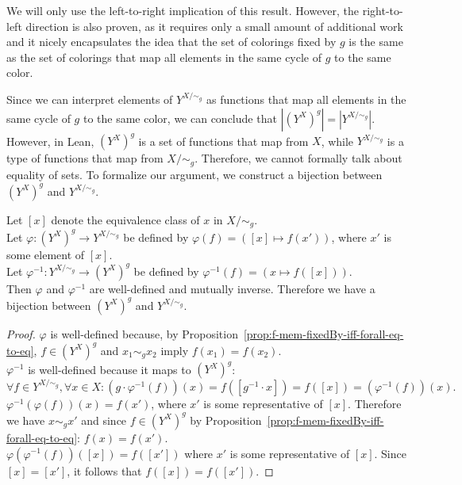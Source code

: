 We will only use the left-to-right implication of this result. However, the right-to-left direction is also proven, as it requires only a small amount of additional work and it nicely encapsulates the idea that the set of colorings fixed by $g$ is the same as the set of colorings that map all elements in the same cycle of $g$ to the same color.

Since we can interpret elements of $Y^{X/\sim_g}$ as functions that map all elements in the same cycle of $g$ to the same color, we can conclude that $|(Y^X)^g| = |Y^{X/\sim_g}|$. However, in Lean, $(Y^X)^g$ is a set of functions that map from $X$, while $Y^{X/\sim_g}$ is a type of functions that map from $X/\sim_g$. Therefore, we cannot formally talk about equality of sets. To formalize our argument, we construct a bijection between $(Y^X)^g$ and $Y^{X/\sim_g}$.

\begin{proposition}
  \label{prop:equiv-of-fixedBy-coloring-of-cycle-coloring}
  \leanok
  Let $[x]$ denote the equivalence class of $x$ in $X/\sim_g$.\\
  Let $\varphi : (Y^X)^g \to Y^{X/\sim_g}$ be defined by $\varphi(f) = ([x] \mapsto f(x'))$, where $x'$ is some element of $[x]$.\\
  Let $\varphi^{-1} : Y^{X/\sim_g} \to (Y^X)^g$ be defined by $\varphi^{-1}(f) = (x \mapsto f([x]))$.\\
  Then $\varphi$ and $\varphi^{-1}$ are well-defined and mutually inverse. Therefore we have a bijection between $(Y^X)^g$ and $Y^{X/\sim_g}$.
\end{proposition}

\begin{proof}
  \leanok
  $\varphi$ is well-defined because, by Proposition~\ref{prop:f-mem-fixedBy-iff-forall-eq-to-eq}, $f \in (Y^X)^g$ and $x_1 \sim_g x_2$ imply $f(x_1) = f(x_2)$.\\
  $\varphi^{-1}$ is well-defined because it maps to $(Y^X)^g$:
  \begin{equation*}
    \forall f \in Y^{X/\sim_g}, \forall x \in X: (g \cdot \varphi^{-1}(f))(x) = f([g^{-1} \cdot x]) = f([x]) = (\varphi^{-1}(f))(x).
  \end{equation*}
  $\varphi^{-1}(\varphi(f))(x) = f(x')$, where $x'$ is some representative of $[x]$. Therefore we have $x \sim_g x'$ and since $f \in (Y^X)^g$ by Proposition~\ref{prop:f-mem-fixedBy-iff-forall-eq-to-eq}: $f(x) = f(x')$.\\
  $\varphi(\varphi^{-1}(f))([x]) = f([x'])$ where $x'$ is some representative of $[x]$. Since $[x] = [x']$, it follows that $f([x]) = f([x'])$.
\end{proof}

